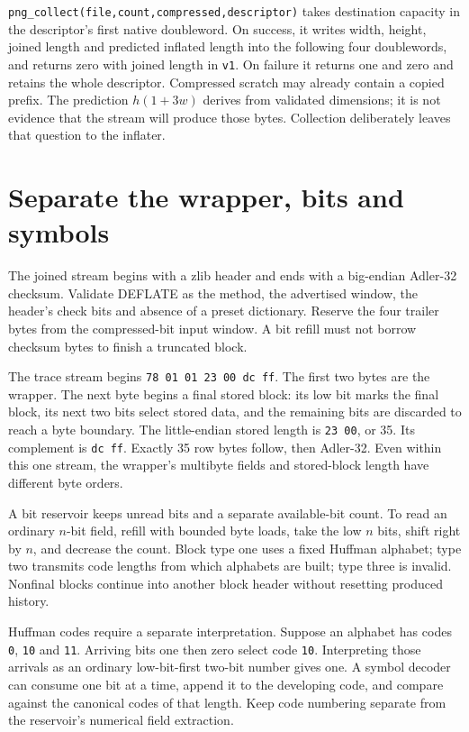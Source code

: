 \texttt{png\_collect(file,count,compressed,descriptor)} takes destination
capacity in the descriptor's first native doubleword. On success, it writes
width, height, joined length and predicted inflated length into the following
four doublewords, and returns zero with joined length in \texttt{v1}.
On failure it returns one and zero and retains the whole descriptor. Compressed
scratch may already contain a copied prefix. The prediction $h(1+3w)$ derives
from validated dimensions; it is not evidence that the stream will produce
those bytes. Collection deliberately leaves that question to the inflater.

\section{Separate the wrapper, bits and symbols}

The joined stream begins with a zlib header and ends with a big-endian Adler-32
checksum. Validate DEFLATE as the method, the advertised window, the header's
check bits and absence of a preset dictionary. Reserve the four trailer bytes
from the compressed-bit input window. A bit refill must not borrow checksum
bytes to finish a truncated block.

The trace stream begins \texttt{78 01 01 23 00 dc ff}. The first two bytes
are the wrapper. The next byte begins a final stored block: its low bit marks
the final block, its next two bits select stored data, and the remaining bits
are discarded to reach a byte boundary. The little-endian stored length is
\texttt{23 00}, or 35. Its complement is \texttt{dc ff}. Exactly 35 row bytes
follow, then Adler-32. Even within this one stream, the wrapper's multibyte
fields and stored-block length have different byte orders.

A bit reservoir keeps unread bits and a separate available-bit count. To read
an ordinary $n$-bit field, refill with bounded byte loads, take the low $n$
bits, shift right by $n$, and decrease the count. Block type one uses a fixed
Huffman alphabet; type two transmits code lengths from which alphabets are
built; type three is invalid. Nonfinal blocks continue into another block
header without resetting produced history.

Huffman codes require a separate interpretation. Suppose an alphabet has codes
\texttt{0}, \texttt{10} and \texttt{11}. Arriving bits one then zero select
code \texttt{10}. Interpreting those arrivals as an ordinary low-bit-first
two-bit number gives one. A symbol decoder can consume one bit at a time,
append it to the developing code, and compare against the canonical codes of
that length. Keep code numbering separate from the reservoir's numerical
field extraction.

